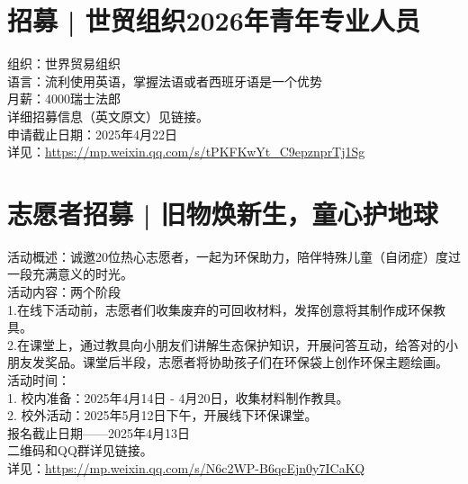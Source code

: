 \documentclass[letterpaper, 12pt]{article}
\begin{document}
\begin{multicols}{2}
\section{招募 | 世贸组织2026年青年专业人员}
组织：世界贸易组织
\\语言：流利使用英语，掌握法语或者西班牙语是一个优势
\\月薪：4000瑞士法郎
\\详细招募信息（英文原文）见链接。
\\申请截止日期：2025年4月22日
\\详见：\url{https://mp.weixin.qq.com/s/tPKFKwYt_C9epznprTj1Sg}

\section{志愿者招募 | 旧物焕新生，童心护地球}
活动概述：诚邀20位热心志愿者，一起为环保助力，陪伴特殊儿童（自闭症）度过一段充满意义的时光。
\\活动内容：两个阶段
\\1.在线下活动前，志愿者们收集废弃的可回收材料，发挥创意将其制作成环保教具。
\\2.在课堂上，通过教具向小朋友们讲解生态保护知识，开展问答互动，给答对的小朋友发奖品。课堂后半段，志愿者将协助孩子们在环保袋上创作环保主题绘画。
\\活动时间：
\\1. 校内准备：2025年4月14日 - 4月20日，收集材料制作教具。
\\2. 校外活动：2025年5月12日下午，开展线下环保课堂。
\\报名截止日期——2025年4月13日
\\二维码和QQ群详见链接。
\\详见：\url{https://mp.weixin.qq.com/s/N6c2WP-B6qcEjn0y7ICaKQ}


\end{multicols}
\end{document}
